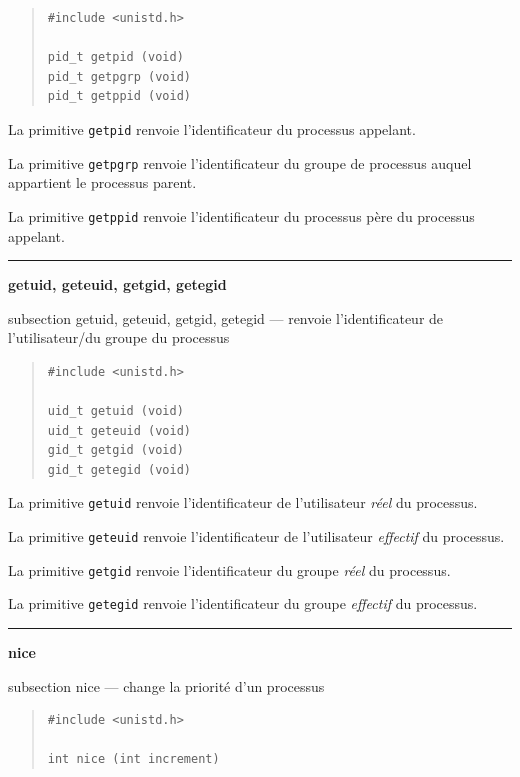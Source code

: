\documentclass [twoside] {report}
\newcommand {\primitive} [1]
    {
	\phantomsection
	{\large \textbf {#1}}
	\addcontentsline {toc} {subsection} {#1}
    }
\newcommand {\separation}
    {
	\vspace {5mm}
	\nopagebreak
	\hrule
    }
\begin{document}
\begin {quote}
\begin {verbatim}
#include <unistd.h>

pid_t getpid (void)
pid_t getpgrp (void)
pid_t getppid (void)
\end{verbatim}
\end {quote}

La primitive \texttt {getpid} renvoie l'identificateur
du processus appelant.

La primitive \texttt {getpgrp} renvoie l'identificateur
du groupe de processus auquel appartient le
processus parent.

La primitive \texttt {getppid} renvoie l'identificateur
du processus père du processus appelant.




\separation
\primitive {getuid, geteuid, getgid, getegid} --- renvoie l'identificateur de l'utilisateur/du groupe du processus

\begin {quote}
\begin {verbatim}
#include <unistd.h>

uid_t getuid (void)
uid_t geteuid (void)
gid_t getgid (void)
gid_t getegid (void)
\end{verbatim}
\end {quote}

La primitive \texttt {getuid} renvoie l'identificateur
de l'utilisateur \textit {réel} du processus.

La primitive \texttt {geteuid} renvoie l'identificateur
de l'utilisateur \textit {effectif} du processus.

La primitive \texttt {getgid} renvoie l'identificateur
du groupe \textit {réel} du processus.

La primitive \texttt {getegid} renvoie l'identificateur
du groupe \textit {effectif} du processus.




\separation
\primitive {nice} --- change la priorité d'un processus

\begin {quote}
\begin {verbatim}
#include <unistd.h>

int nice (int increment)
\end{verbatim}
\end {quote}
\end{document}
